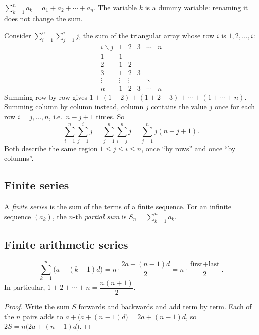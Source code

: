 \begin{definition}
$\displaystyle\sum_{k=1}^n a_k = a_1+a_2+\cdots+a_n$. The variable $k$ is a dummy variable: renaming it does not change the sum.
\end{definition}

\begin{example}
Consider $\sum_{i=1}^{n}\sum_{j=1}^{i} j$, the sum of the triangular array whose row $i$ is $1,2,\dots,i$:
\[
\begin{array}{c|ccccc}
i \backslash j & 1 & 2 & 3 & \cdots & n \\\hline
1 & 1 & & & & \\
2 & 1 & 2 & & & \\
3 & 1 & 2 & 3 & & \\
\vdots & \vdots & \vdots & & \ddots & \\
n & 1 & 2 & 3 & \cdots & n
\end{array}
\]
Summing row by row gives $1+(1+2)+(1+2+3)+\cdots+(1+\cdots+n)$. Summing column by column instead, column $j$ contains the value $j$ once for each row $i=j,\dots,n$, i.e.\ $n-j+1$ times. So
\[
\sum_{i=1}^{n}\sum_{j=1}^{i} j = \sum_{j=1}^{n}\sum_{i=j}^{n} j = \sum_{j=1}^n j(n-j+1).
\]
Both describe the same region $1\le j\le i\le n$, once ``by rows'' and once ``by columns''.
\end{example}

\subsection{Finite series}
\label{sec:6-11}

\begin{definition}
A \emph{finite series} is the sum of the terms of a finite sequence. For an infinite sequence $(a_k)$, the $n$-th \emph{partial sum} is $S_n=\sum_{k=1}^n a_k$.
\end{definition}

\subsection{Finite arithmetic series}
\label{sec:6-12}

\begin{theorem}
\[
\sum_{k=1}^n \bigl(a+(k-1)d\bigr) = n\cdot\frac{2a+(n-1)d}{2} = n\cdot\frac{\text{first}+\text{last}}{2}.
\]
In particular, $1+2+\cdots+n=\dfrac{n(n+1)}{2}$.
\end{theorem}
\begin{proof}
Write the sum $S$ forwards and backwards and add term by term. Each of the $n$ pairs adds to $a+\bigl(a+(n-1)d\bigr)=2a+(n-1)d$, so $2S=n\bigl(2a+(n-1)d\bigr)$.
\end{proof}

